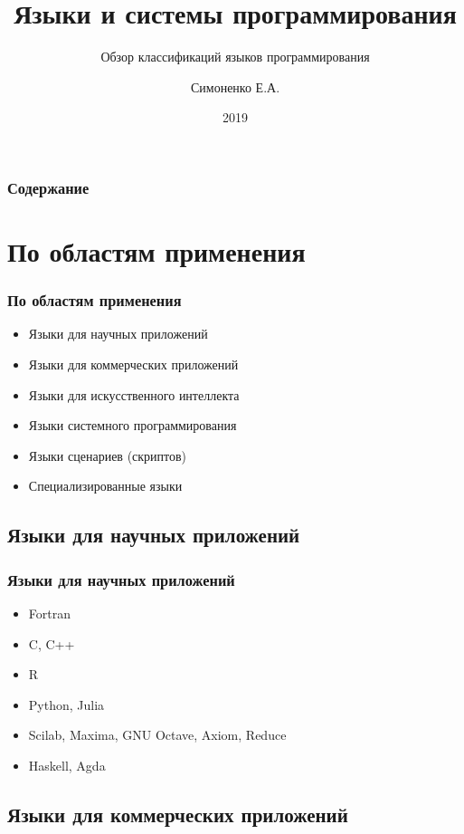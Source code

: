 \documentclass[9pt,pdf]{beamer}
\begin{document}
	
\author{Симоненко Е.А.}
\title{Языки и системы программирования}
\subtitle{Обзор классификаций языков программирования}
\date{2019}

\nocite{*}
	
\begin{frame}
	\titlepage
\end{frame}
	
\begin{frame}
	\frametitle{Содержание}
	\tableofcontents
\end{frame}

\section{По областям применения}

\begin{frame}
	\frametitle{По областям применения}
	\begin{itemize}
		\item Языки для научных приложений
		\item Языки для коммерческих приложений
		\item Языки для искусственного интеллекта
		\item Языки системного программирования
		\item Языки сценариев (скриптов)
		\item Специализированные языки
	\end{itemize}
\end{frame}

\subsection{Языки для научных приложений}

\begin{frame}
	\frametitle{Языки для научных приложений}
	\begin{itemize}
		\item Fortran
		\item C, C++
		\item R
		\item Python, Julia
		\item Scilab, Maxima, GNU Octave, Axiom, Reduce
		\item Haskell, Agda
	\end{itemize}
\end{frame}

\subsection{Языки для коммерческих приложений}
\end{document}
